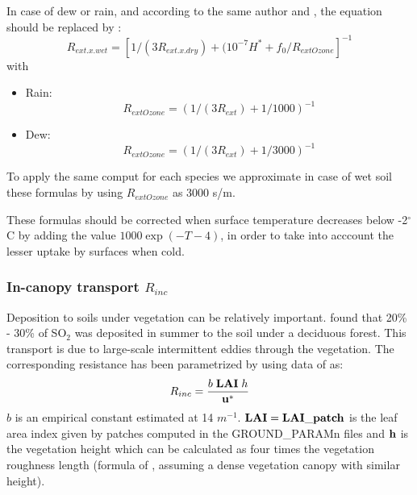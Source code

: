 In case of dew or rain, and according to the same author and
\citep{Walmsley1996}, the equation should be replaced by :
\[R_{ext.x.wet}=[1/(3R_{ext.x.dry})+(10^{-7}H^*+f_0/R_{extOzone}]^{-1}\]
with

\begin{itemize}
 
\item { Rain: \[ R_{extOzone} = (1/(3R_{ext})+1/1000 )^{-1}\]  }
 
\item { Dew: \[ R_{extOzone} = (1/(3R_{ext})+1/3000 )^{-1}\]  }
\end{itemize}
 
To apply the same comput for each species we approximate in case of
wet soil these formulas by 
using $R_{extOzone}$ as 3000 s/m.

These formulas should be corrected when surface
temperature decreases below -2$^\circ$C by adding the value
$1000 \exp (-T-4)$, in order to take into acccount the lesser uptake
by surfaces 
when cold.
\subsubsection*{In-canopy transport $R_{inc}$}

Deposition to soils under vegetation can be relatively important. 
\cite{Meyers1988} found that 20\% - 30\% of SO$_2$ was deposited 
in summer to the soil under a deciduous forest.
This transport is due to large-scale intermittent eddies through the
vegetation. 
The corresponding resistance has been parametrized by \cite{Erisman1994}
using data of \cite{vanPul1994}
as:
\[ R_{inc}=\frac{b\; {\bf LAI}\; h}{\bf{u^*}}\]        %
$b$ is an empirical constant estimated at 14 $m^{-1}$. $\bf LAI=
LAI\_patch$ is the  
leaf area index given by patches computed in the GROUND\_PARAMn files
and $\bf h$ is the 
vegetation height which can be calculated as four times the 
vegetation roughness length
(formula of \cite{Kondo1986}, assuming a dense vegetation canopy
with similar height).

\medskip
